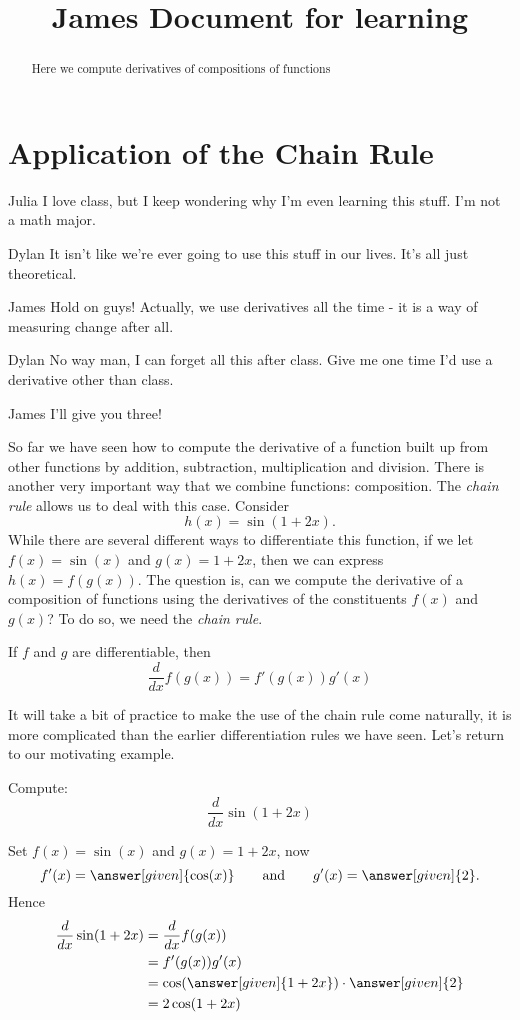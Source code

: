 \documentclass{ximera}
\begin{document}
\title{James Document for learning}
\section{Application of the Chain Rule}

\begin{abstract}
Here we compute derivatives of compositions of functions
\end{abstract}

\begin{dialogue}
\item[Julia] I love class, but I keep wondering why I'm even learning this stuff. I'm not a math major.
\item[Dylan] It isn't like we're ever going to use this stuff in our lives. It's all just theoretical.
\item[James] Hold on guys! Actually, we use derivatives all the time - it is a way of measuring change after all.
\item[Dylan] No way man, I can forget all this after class. Give me one time I'd use a derivative other than class.
\item[James] I'll give you three!
\end{dialogue}


So far we have seen how to compute the derivative of a function built up from other functions by addition, subtraction, multiplication and division. There is another very important way that we combine functions: composition. The \textit{chain rule} allows us to deal with this case. Consider
\[
h(x) = \sin(1+2x).
\] 
While there are several different ways to differentiate this function, if we let $f(x) = \sin(x)$ and $g(x) = 1+2x$, then we can express $h(x) = f(g(x))$. The question is, can we compute the derivative of a composition of functions using the derivatives of the constituents $f(x)$ and $g(x)$? To do so, we need the \textit{chain rule}.


\begin{theorem}
If $f$ and $g$ are differentiable, then
\[
\dfrac{d}{dx} f(g(x)) = f'(g(x))g'(x)
\]
\end{theorem}


It will take a bit of practice to make the use of the chain rule come
naturally, it is more complicated than the earlier differentiation
rules we have seen. Let's return to our motivating example.

\begin{example}
Compute:
\[
\dfrac{d}{dx} \sin(1+2x)
\]

\begin{explanation}
Set $f(x) = \sin(x)$ and $g(x) = 1+2x$, now
\[
f'(x) = \answer[given]{\cos(x)} \qquad\text{and}\qquad g'(x) = \answer[given]{2}.
\]
Hence
\begin{align*}
\dfrac{d}{dx} \sin(1+2x) &= \dfrac{d}{dx} f(g(x)) \\
 &=f'(g(x))g'(x) \\
 &= \cos(\answer[given]{1+2x})\cdot \answer[given]{2} \\
 &= 2\cos(1+2x)
\end{align*}
\end{explanation}
\end{example}
\end{document}
